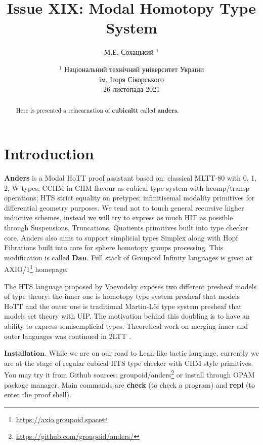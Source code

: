 \documentclass{article}
\theoremstyle{definition}
\begin{document}
\author { М.Е. Сохацький $^1$ }
\title { Issue XIX: Modal Homotopy Type System }
\date{ \small $^1$ Національний технічний університет України \\
       ім. Ігоря Сікорського \\
       26 листопада 2021 }
\maketitle

\begin{abstract}
Here is presented a reincarnation of \textbf{cubicaltt} called \textbf{anders}.
\end{abstract}

\section{Introduction}

\textbf{Anders} is a Modal HoTT proof assistant based on: classical MLTT-80 \cite{MLTT80}
with 0, 1, 2, W types; CCHM \cite{CCHM} in CHM \cite{CHM} flavour as cubical type system with
hcomp/transp operations; HTS \cite{HTS} strict equality on pretypes;
infinitisemal \cite{deRham} modality primitives for differential geometry purposes.
We tend not to touch general recursive higher inductive schemes,
instead we will try to express as much HIT as possible through Suspensions, Truncations,
Quotients primitives built into type checker core.
Anders also aims to support simplicial types Simplex along with Hopf Fibrations
built into core for sphere homotopy groups processing. This modification is called \textbf{Dan}.
Full stack of Groupoid Infinity languages is given at AXIO/1\footnote{\url{https://axio.groupoid.space}} homepage.

The HTS language proposed by Voevodsky exposes two different presheaf models of type theory:
the inner one is homotopy type system presheaf that models HoTT and the outer one is
traditional Martin-Löf type system presheaf that models set theory with UIP.
The motivation behind this doubling is to have an ability to express semisemplicial types.
Theoretical work on merging inner and outer languages was continued in 2LTT \cite{2LTT}.

$\mathbf{Installation}$. While we are on our road to Lean-like tactic language, currently we are at the stage of
regular cubical HTS type checker with CHM-style primitives. You may try it from Github
sources: groupoid/anders\footnote{\url{https://github.com/groupoid/anders/}} or install
through OPAM package manager. Main commands are \textbf{check} (to check a program)
and \textbf{repl} (to enter the proof shell).
\end{document}
